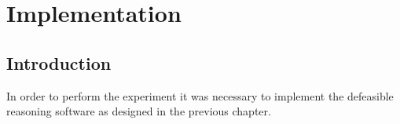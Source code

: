 
\chapter{Implementation} %

\label{Chapter4} %



\section{Introduction}

In order to perform the experiment it was necessary to implement the defeasible reasoning software as designed in the previous chapter.  
 





